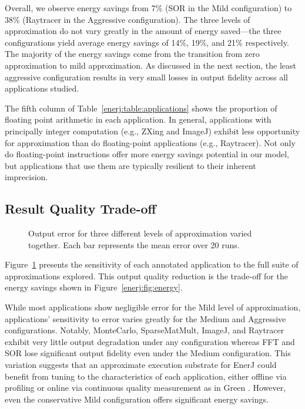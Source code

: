 Overall, we observe energy savings from 7\% (SOR in the Mild
configuration) to 38\% (Raytracer in the Aggressive
configuration). The three levels of approximation do not vary greatly
in the amount of energy saved---the three configurations yield average
energy savings of 14\%, 19\%, and 21\% respectively. The majority of
the energy savings come from the transition from zero approximation to
mild approximation. As discussed in the next section, the least
aggressive configuration results in very small losses in output
fidelity across all applications studied.

The fifth column of Table~\ref{enerj:table:applications} shows the proportion of
floating point arithmetic in each application. In general, applications with
principally integer computation (e.g., ZXing and ImageJ) exhibit less
opportunity for approximation than do floating-point applications (e.g.,
Raytracer). Not only do floating-point instructions offer more energy savings
potential in our model, but applications that use them are typically resilient
to their inherent imprecision.

\subsection{Result Quality Trade-off}
\begin{figure}
\center
\sffamily

\caption{Output error for three different levels of approximation varied
together. Each bar represents the mean error over 20 runs.}
\label{enerj:fig:sensitivity}
\end{figure}

Figure~\ref{enerj:fig:sensitivity} presents the sensitivity of each
annotated application to the full suite of approximations
explored. This output quality reduction is the trade-off for the
energy savings shown in Figure~\ref{enerj:fig:energy}.

While most applications show negligible error for the Mild level of
approximation, applications' sensitivity to error varies greatly for the Medium
and Aggressive configurations. Notably, MonteCarlo, SparseMatMult, ImageJ, and
Raytracer exhibit
very little output degradation under any configuration whereas FFT and SOR lose
significant output fidelity even under the Medium configuration.
This variation suggests that an approximate execution substrate for EnerJ
could benefit from tuning to the characteristics of each application,
either offline via profiling or online via continuous quality measurement
as in Green \cite{green}.
However, even the
conservative Mild configuration offers significant energy savings.

